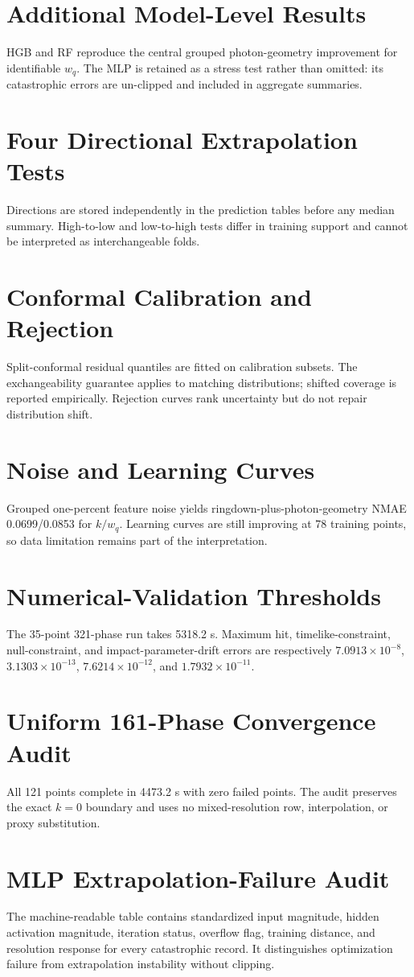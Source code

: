 \documentclass[11pt]{article}
\newcommand{\wq}{w_q}
\begin{document}
\section{Additional Model-Level Results}
HGB and RF reproduce the central grouped photon-geometry improvement for
identifiable $\wq$. The MLP is retained as a stress test rather than omitted:
its catastrophic errors are un-clipped and included in aggregate summaries.

\section{Four Directional Extrapolation Tests}
Directions are stored independently in the prediction tables before any median
summary. High-to-low and low-to-high tests differ in training support and cannot
be interpreted as interchangeable folds.

\section{Conformal Calibration and Rejection}
Split-conformal residual quantiles are fitted on calibration subsets. The
exchangeability guarantee applies to matching distributions; shifted coverage
is reported empirically. Rejection curves rank uncertainty but do not repair
distribution shift.

\section{Noise and Learning Curves}
Grouped one-percent feature noise yields ringdown-plus-photon-geometry NMAE
0.0699/0.0853 for $k/\wq$. Learning curves are still improving at 78 training
points, so data limitation remains part of the interpretation.

\section{Numerical-Validation Thresholds}
The 35-point 321-phase run takes 5318.2 s. Maximum hit, timelike-constraint,
null-constraint, and impact-parameter-drift errors are respectively
$7.0913\times10^{-8}$, $3.1303\times10^{-13}$,
$7.6214\times10^{-12}$, and $1.7932\times10^{-11}$.

\section{Uniform 161-Phase Convergence Audit}
All 121 points complete in 4473.2 s with zero failed points. The audit preserves
the exact $k=0$ boundary and uses no mixed-resolution row, interpolation, or
proxy substitution.

\section{MLP Extrapolation-Failure Audit}
The machine-readable table contains standardized input magnitude, hidden
activation magnitude, iteration status, overflow flag, training distance, and
resolution response for every catastrophic record. It distinguishes
optimization failure from extrapolation instability without clipping.

\FloatBarrier


\end{document}
